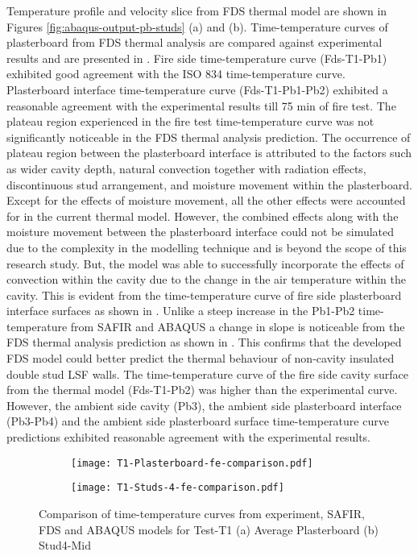 Temperature profile and velocity slice from FDS thermal model are shown in Figures \ref{fig:abaqus-output-pb-studs} (a) and (b). Time-temperature curves of plasterboard from FDS thermal analysis are compared against experimental results and are presented in .  Fire side time-temperature curve (Fds-T1-Pb1) exhibited good agreement with the ISO 834 time-temperature curve. Plasterboard interface time-temperature curve (Fds-T1-Pb1-Pb2) exhibited a reasonable agreement with the experimental results till 75 min of fire test. The plateau region experienced in the fire test time-temperature curve was not significantly noticeable in the FDS thermal analysis prediction. The occurrence of plateau region between the plasterboard interface is attributed to the factors such as wider cavity depth, natural convection together with radiation effects, discontinuous stud arrangement, and moisture movement within the plasterboard. Except for the effects of moisture movement, all the other effects were accounted for in the current thermal model. However, the combined effects along with the moisture movement between the plasterboard interface could not be simulated due to the complexity in the modelling technique and is beyond the scope of this research study. But, the model was able to successfully incorporate the effects of convection within the cavity due to the change in the air temperature within the cavity. This is evident from the time-temperature curve of fire side plasterboard interface surfaces as shown in . Unlike a steep increase in the Pb1-Pb2 time-temperature from SAFIR and ABAQUS a change in slope is noticeable from the FDS thermal analysis prediction as shown in . This confirms that the developed FDS model could better predict the thermal behaviour of non-cavity insulated double stud LSF walls. The time-temperature curve of the fire side cavity surface from the thermal model (Fds-T1-Pb2) was higher than the experimental curve. However, the ambient side cavity (Pb3), the ambient side plasterboard interface (Pb3-Pb4) and the ambient side plasterboard surface time-temperature curve predictions exhibited reasonable agreement with the experimental results.
\begin{figure}[!htbp]
	\centering
	\begin{subfigure}[b]{0.7\textwidth}
		\centering
		\texttt{[image: T1-Plasterboard-fe-comparison.pdf]}
		\caption{}
		\label{subfig:T1-Plasterboard-fe-comparison}
	\end{subfigure}
	\begin{subfigure}[b]{0.6\textwidth}
		\centering
		\texttt{[image: T1-Studs-4-fe-comparison.pdf]}
		\caption{}
		\label{subfig:T1-Studs-4-fe-comparison}
	\end{subfigure}
	   \caption{Comparison of time-temperature curves from experiment, SAFIR, FDS and ABAQUS models for Test-T1 (a) Average Plasterboard (b) Stud4-Mid}
	   \label{fig:fe-model-output-comparison}
\end{figure}
